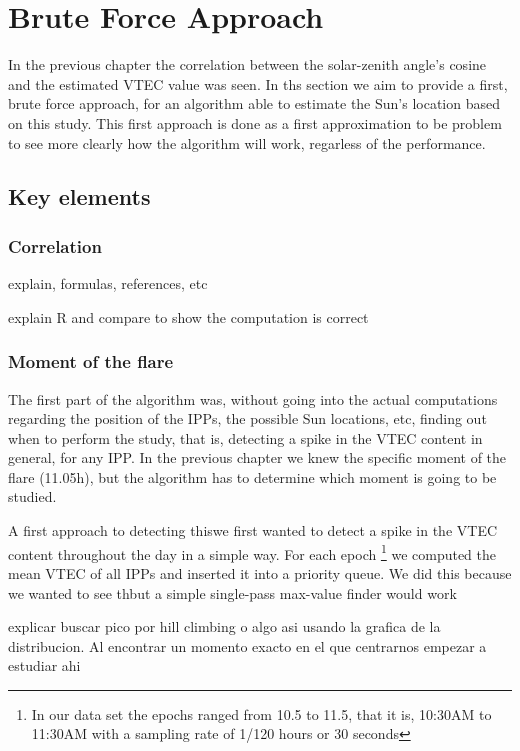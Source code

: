 \chapter{Brute Force Approach}

In the previous chapter the correlation between the solar-zenith angle's cosine and the estimated VTEC value was seen. In ths section we aim to provide a first, brute force approach, for an algorithm able to estimate the Sun's location based on this study. This first approach is done as a first approximation to be problem to see more clearly how the algorithm will work, regarless of the performance.

\section{Key elements}

\subsection{Correlation}

explain, formulas, references, etc

explain R and compare to show the computation is correct

\subsection{Moment of the flare}

The first part of the algorithm was, without going into the actual computations regarding the position of the IPPs, the possible Sun locations, etc, finding out when to perform the study, that is, detecting a spike in the VTEC content in general, for any IPP. In the previous chapter we knew the specific moment of the flare (11.05h), but the algorithm has to determine which moment is going to be studied.

A first approach to detecting thiswe first wanted to detect a spike in the VTEC content throughout the day in a simple way. For each epoch \footnote{In our data set the epochs ranged from 10.5 to 11.5, that it is, 10:30AM to 11:30AM with a sampling rate of 1/120 hours or 30 seconds} we computed the mean VTEC of all IPPs and inserted it into a priority queue. We did this because we wanted to see thbut a simple single-pass max-value finder would work

explicar buscar pico por hill climbing o algo asi usando la grafica de la distribucion. Al encontrar un momento exacto en el que centrarnos empezar a estudiar ahi

